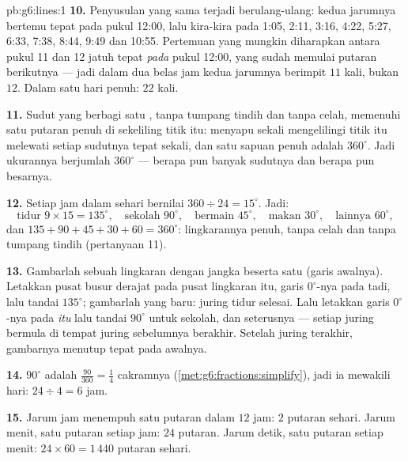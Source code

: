 \begin{solution}{pb:g6:lines:1}
\textbf{10.} Penyusulan yang sama terjadi berulang-ulang: kedua
jarumnya bertemu tepat pada pukul 12:00, lalu kira-kira pada 1:05,
2:11, 3:16, 4:22, 5:27, 6:33, 7:38, 8:44, 9:49 dan 10:55. Pertemuan
yang mungkin diharapkan antara pukul 11 dan 12 jatuh tepat \emph{pada}
pukul 12:00, yang sudah memulai putaran berikutnya --- jadi dalam dua
belas jam kedua jarumnya berimpit $11$ kali, bukan $12$. Dalam satu
hari penuh: $22$ kali.

\textbf{11.} Sudut yang berbagi satu , tanpa tumpang tindih
dan tanpa celah, memenuhi satu putaran penuh di sekeliling titik itu:
menyapu sekali mengelilingi titik itu melewati setiap sudutnya tepat
sekali, dan satu sapuan penuh adalah $360^\circ$. Jadi ukurannya
berjumlah $360^\circ$ --- berapa pun banyak sudutnya dan berapa pun besarnya.

\textbf{12.} Setiap jam dalam sehari bernilai
$360 \div 24 = 15^\circ$. Jadi:
\[
\text{tidur } 9 \times 15 = 135^\circ, \quad
\text{sekolah } 90^\circ, \quad
\text{bermain } 45^\circ, \quad
\text{makan } 30^\circ, \quad
\text{lainnya } 60^\circ,
\]
dan $135 + 90 + 45 + 30 + 60 = 360^\circ$: lingkarannya penuh, tanpa
celah dan tanpa tumpang tindih (pertanyaan 11).

\textbf{13.} Gambarlah sebuah lingkaran dengan jangka beserta satu
 (garis awalnya). Letakkan pusat busur derajat pada pusat
lingkaran itu, garis $0^\circ$-nya pada  tadi, lalu tandai
$135^\circ$; gambarlah  yang baru: juring tidur selesai.
Lalu letakkan garis $0^\circ$-nya pada \emph{ itu} lalu
tandai $90^\circ$ untuk sekolah, dan seterusnya --- setiap juring
bermula di tempat juring sebelumnya berakhir. Setelah juring terakhir,
gambarnya menutup tepat pada  awalnya.

\textbf{14.} $90^\circ$ adalah $\frac{90}{360} = \frac14$ cakramnya
(\cref{met:g6:fractions:simplify}), jadi ia mewakili  hari:
$24 \div 4 = 6$ jam.

\textbf{15.} Jarum jam menempuh satu putaran dalam $12$ jam: $2$
putaran sehari. Jarum menit, satu putaran setiap jam: $24$ putaran.
Jarum detik, satu putaran setiap menit: $24 \times 60 = 1\,440$
putaran sehari.

\end{solution}
